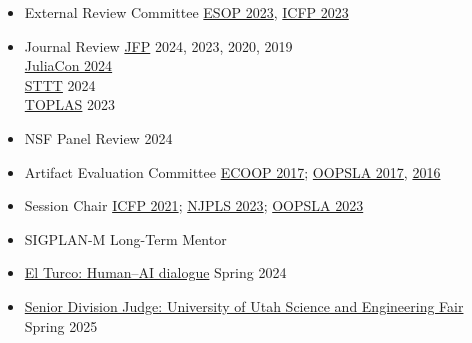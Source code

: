 \documentclass[11pt]{article}
\begin{document}
\begin{itemize}
  \item {External Review Committee} \hfill \href{https://etaps.org/2023/esop}{ESOP 2023},
                                           \href{https://icfp23.sigplan.org/}{ICFP 2023}
  \item {Journal Review}
           \hfill \href{https://www.cambridge.org/core/journals/journal-of-functional-programming}{JFP} 2024, 2023, 2020, 2019 \\ %
    \hbox{}\hfill \href{https://juliacon.org/2024/}{JuliaCon 2024} \\
    \hbox{}\hfill \href{https://link.springer.com/journal/10009}{STTT} 2024 \\
    \hbox{}\hfill \href{https://dl.acm.org/journal/toplas}{TOPLAS} 2023 %
  \item {NSF Panel Review} \hfill {2024}
  \item {Artifact Evaluation Committee} \hfill \href{https://2017.ecoop.org/track/ecoop-2017-Artifacts}{ECOOP 2017};
                                               \href{https://2017.splashcon.org/track/splash-2017-OOPSLA-Artifacts}{OOPSLA 2017},
                                               \href{http://2016.splashcon.org/track/splash-2016-artifacts}{2016}
  \item {Session Chair} \hfill \href{https://icfp21.sigplan.org/program/program-icfp-2021/}{ICFP 2021};
                               \href{https://www.njpls.org/nov2023.html}{NJPLS 2023};
                               \href{https://2023.splashcon.org/program/program-splash-2023/?date=Wed%2025%20Oct%202023&room=Room%20II}{OOPSLA 2023}
                             \item {SIGPLAN-M Long-Term Mentor} \hfill {}
  \item \href{https://elturco.diemutstrebe.com}{El Turco: Human--AI dialogue} \hfill Spring 2024
  \item \href{https://usef.utah.edu/fair-details}{Senior Division Judge: University of Utah Science and Engineering Fair} \hfill Spring 2025

\end{itemize}

\end{document}
